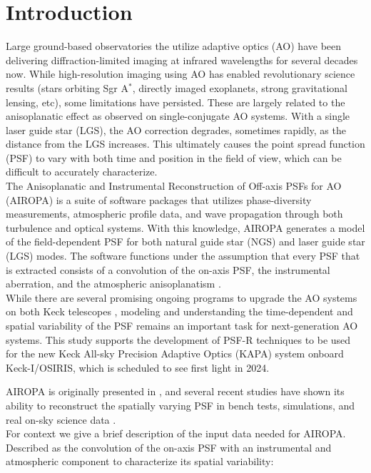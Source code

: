 \documentclass[]{spie}  %
\begin{document}
\section{Introduction} \label{sec:intro}
Large ground-based observatories the utilize adaptive optics (AO) have been delivering diffraction-limited imaging at infrared wavelengths for several decades now. While high-resolution imaging using AO has enabled revolutionary science results (stars orbiting Sgr A$^*$, directly imaged exoplanets, strong gravitational lensing, etc), some limitations have persisted. These are largely related to the anisoplanatic effect as observed on single-conjugate AO systems. With a single laser guide star (LGS), the AO correction degrades, sometimes rapidly, as the distance from the LGS increases. This ultimately causes the point spread function (PSF) to vary with both time and position in the field of view, which can be difficult to accurately characterize.\\
\indent The Anisoplanatic and Instrumental Reconstruction of Off-axis PSFs for AO (AIROPA) is a suite of software packages that utilizes phase-diversity measurements, atmospheric profile data, and wave propagation through both turbulence and optical systems. With this knowledge, AIROPA generates a model of the field-dependent PSF for both natural guide star (NGS) and laser guide star (LGS) modes. The software functions under the assumption that every PSF that is extracted consists of a convolution of the on-axis PSF, the instrumental aberration, and the atmospheric anisoplanatism \cite{do:2018a}.\\
\indent While there are several promising ongoing programs to upgrade the AO systems on both Keck telescopes \cite{wizinowich:2020a, bond:2020a}, modeling and understanding the time-dependent and spatial variability of the PSF remains an important task for next-generation AO systems. This study supports the development of PSF-R techniques to be used for the new Keck All-sky Precision Adaptive Optics (KAPA) system onboard Keck-I/OSIRIS, which is scheduled to see first light in 2024.

AIROPA is originally presented in \cite{witzel:2016a}, and several recent studies have shown its ability to reconstruct the spatially varying PSF in bench tests, simulations, and real on-sky science data \citep{Ciurlo:inprep, turri:2022}.
\vspace{1cm}
\\
\indent For context we give a brief description of the input data needed for AIROPA. Described as the convolution of the on-axis PSF with an instrumental and atmospheric component to characterize its spatial variability:
\end{document}
